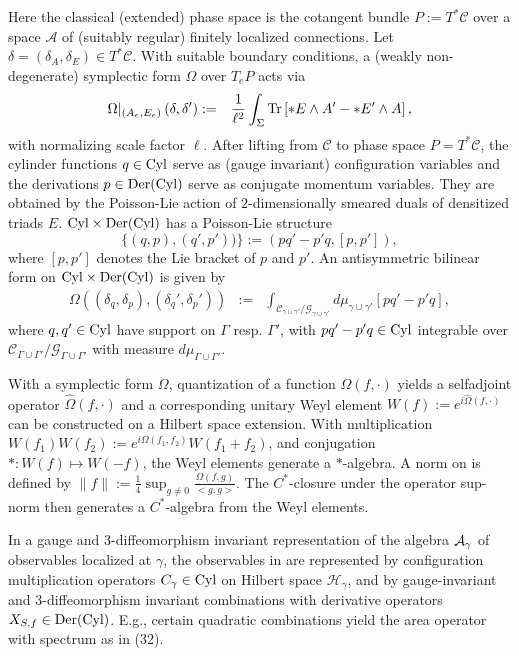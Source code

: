\documentclass[11pt,a4paper]{article}
\theoremstyle{definition}
\newcommand{\beq}[1]{\begin{equation}\label{#1}}
\newcommand{\eeq}{\end{equation}}
\newcommand{\bear}[1]{\begin{eqnarray}\label{#1}}
\newcommand{\ear}{\end{eqnarray}}
\newcommand{\Cyl}{ \mbox{\rm Cyl} }
\newcommand{\Der}{ \mbox{\rm Der}(\Cyl) }
\begin{document}
	Here the classical (extended) phase space is the cotangent
	bundle  $P:=T^*{\mathcal{C}}$
	over a space $\mathcal{A}$ of (suitably regular) finitely localized
	connections.
	Let $\delta = ( {\delta_A} , {\delta_E} ) \in T^*{\mathcal{C}}$.
	With suitable boundary conditions,
	a (weakly non-degenerate) symplectic form $\Omega$ over $T_e P$
	acts via
	\bear{sympl}
	\Omega|_{(A_e,E_e)}
	\left ( \delta, \delta' \right )
	&:=&
	\frac{1}{\ell^2} \int_{\Sigma} {\rm Tr}
	\left [  *E \wedge A'  -   *E' \wedge A  \right ] ,
	\ear
	with normalizing scale factor $\ell$. After lifting from $\mathcal{C}$ to phase space $P=T^*{\mathcal{C}}$,
	the cylinder functions $q\in\Cyl$ serve as
	(gauge invariant) configuration variables and
	the derivations $p\in\Der$ serve as conjugate momentum variables. They are obtained by the Poisson-Lie action
	of $2$-dimensionally smeared duals of densitized triads $E$.
	$\Cyl\times\Der$ has a Poisson-Lie structure
	\beq{Poisson}
	\{(q,p),(q',p'))\}:=(p q'- p' q  ,[p,p']) ,
	\eeq
	where $[p,p']$ denotes the Lie bracket of $p$ and $p'$.
	An antisymmetric bilinear form on $\Cyl\times\Der$ is given by
	\bear{pres}
	\Omega
	\left ( {(\delta_q,\delta_p)}, {(\delta_q',\delta_p')} \right )
	&:=&
	\int_{{\mathcal{C}_{\gamma\cup\gamma'}}/
		{\mathcal{G}_{\gamma\cup\gamma'}}}d\mu_{\gamma\cup\gamma'}
	\left [  p  q'  -   p' q  \right ] ,
	\ear
	where $q,q'\in \Cyl$ have support on $\Gamma$ resp. $\Gamma'$,
	with $p  q' -  p' q\in \Cyl$
	integrable over ${\mathcal{C}_{\Gamma\cup\Gamma'}}/
	{\mathcal{G}_{\Gamma\cup\Gamma'}}$ with
	measure $d\mu_{\Gamma\cup\Gamma'}$.
	
	With a symplectic form $\Omega$, 
	quantization of a function $\Omega(f,\cdot)$ yields a selfadjoint operator $\hat\Omega(f,\cdot)$
	and a corresponding
	unitary Weyl element $W(f):=e^{i\hat\Omega(f,\cdot)}$ can be constructed
	on a Hilbert space extension.
	With multiplication
	$W(f_1) W(f_2) := e^{i\Omega(f_1,f_2)}W(f_1+f_2)$,
	and conjugation $*: W(f)\mapsto W(-f)$,
	the Weyl elements generate a $*$-algebra.
	A norm on is defined by
	$\|f\|:=\frac{1}{4}\sup_{g\neq 0}\frac{\Omega(f,g)}{<g,g>}$.
	The $C^*$-closure under the operator sup-norm then generates
	a  $C^*$-algebra from the Weyl elements.
	
	In a gauge and $3$-diffeomorphism invariant
	representation of the algebra ${\cal A}_{\gamma}$ of  observables localized at $\gamma$,
	the observables in are represented by
	configuration multiplication operators $C_{\gamma}\in \Cyl$
	on Hilbert space $\mathcal{H}_{\gamma}$,
	and by gauge-invariant and 3-diffeomorphism invariant
	combinations with derivative operators $X_{S,f}\in \Der$.
	E.g., certain quadratic combinations yield
	the area operator with spectrum as in (32).
	
\end{document}

